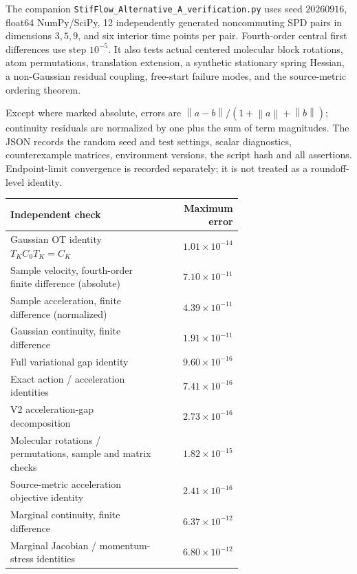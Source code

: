 \documentclass[11pt,letterpaper]{article}
\newcommand{\norm}[1]{\left\lVert#1\right\rVert}
\begin{document}
The companion \texttt{StifFlow\_Alternative\_A\_verification.py} uses seed $20260916$, float64 NumPy/SciPy, 12 independently generated noncommuting SPD pairs in dimensions $3,5,9$, and six interior time points per pair. Fourth-order central first differences use step $10^{-5}$. It also tests actual centered molecular block rotations, atom permutations, translation extension, a synthetic stationary spring Hessian, a non-Gaussian residual coupling, free-start failure modes, and the source-metric ordering theorem.

Except where marked absolute, errors are $\norm{a-b}/(1+\norm a+\norm b)$; continuity residuals are normalized by one plus the sum of term magnitudes. The JSON records the random seed and test settings, scalar diagnostics, counterexample matrices, environment versions, the script hash and all assertions. Endpoint-limit convergence is recorded separately; it is not treated as a roundoff-level identity.

\begin{center}\small
\begin{tabular}{p{0.67\linewidth}r}
\toprule
Independent check & Maximum error\\\midrule
Gaussian OT identity $T_KC_0T_K=C_K$ & $1.01\times10^{-14}$\\
Sample velocity, fourth-order finite difference (absolute) & $7.10\times10^{-11}$\\
Sample acceleration, finite difference (normalized) & $4.39\times10^{-11}$\\
Gaussian continuity, finite difference & $1.91\times10^{-11}$\\
Full variational gap identity & $9.60\times10^{-16}$\\
Exact action / acceleration identities & $7.41\times10^{-16}$\\
V2 acceleration-gap decomposition & $2.73\times10^{-16}$\\
Molecular rotations / permutations, sample and matrix checks & $1.82\times10^{-15}$\\
Source-metric acceleration objective identity & $2.41\times10^{-16}$\\
Marginal continuity, finite difference & $6.37\times10^{-12}$\\
Marginal Jacobian / momentum-stress identities & $6.80\times10^{-12}$\\
\bottomrule
\end{tabular}
\end{center}
\end{document}
